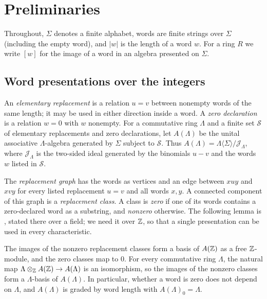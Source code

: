 \section{Preliminaries}\label{sec:prelim}

Throughout, $\Sigma$ denotes a finite alphabet, words are finite strings over $\Sigma$ (including the empty word), and
$|w|$ is the length of a word $w$. For a ring $R$ we write $[w]$ for the image of a word in an algebra presented on
$\Sigma$.

\subsection{Word presentations over the integers}

An \emph{elementary replacement} is a relation $u=v$ between nonempty words of the same length; it may be used in either
direction inside a word. A \emph{zero declaration} is a relation $w=0$ with $w$ nonempty. For a commutative ring
$\Lambda$ and a finite set $\mathcal S$ of elementary replacements and zero declarations, let $A(\Lambda)$ be the unital
associative $\Lambda$-algebra generated by $\Sigma$ subject to $\mathcal S$. Thus
$A(\Lambda)=\Lambda\langle\Sigma\rangle/\mathcal J_\Lambda$, where $\mathcal J_\Lambda$ is the two-sided ideal generated
by the binomials $u-v$ and the words $w$ listed in $\mathcal S$.

The \emph{replacement graph} has the words as vertices and an edge between $xuy$ and $xvy$ for every listed replacement
$u=v$ and all words $x,y$. A connected component of this graph is a \emph{replacement class}. A class is \emph{zero} if
one of its words contains a zero-declared word as a substring, and \emph{nonzero} otherwise. The following lemma is
\cite[Lemma~2.1]{OAI247periodic}, stated there over a field; we need it over $\mathbb Z$, so that a single presentation can be
used in every characteristic.

\begin{lemma}\label{lem:word-basis}
The images of the nonzero replacement classes form a basis of $A(\mathbb Z)$ as a free $\mathbb Z$-module, and the zero classes map to
$0$. For every commutative ring $\Lambda$, the natural map $\Lambda\otimes_{\mathbb Z}A(\mathbb Z)\to A(\Lambda)$ is an isomorphism, so
the images of the nonzero classes form a $\Lambda$-basis of $A(\Lambda)$. In particular, whether a word is zero does not
depend on $\Lambda$, and $A(\Lambda)$ is graded by word length with $A(\Lambda)_0=\Lambda$.
\end{lemma}

